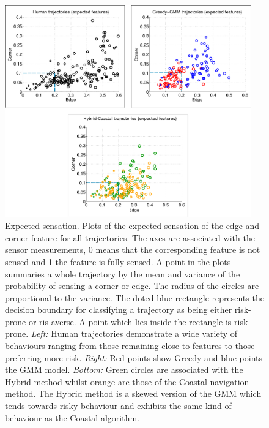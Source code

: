 \begin{figure}[h!]
  \centering
  \includegraphics[width=0.95\textwidth]{./ch3-Search/Figures/Figure6} 
  \caption{Expected sensation. Plots of the expected sensation of the edge and corner feature for all trajectories. 
  The axes are associated with the 
  sensor measurements, 0 means that the corresponding feature is not sensed and 1 the feature is fully sensed. 
  A point in the plots summaries a whole trajectory by the mean and variance of the probability of sensing a corner or edge. 
  The radius of the circles are proportional to the variance. The doted blue rectangle represents the decision boundary 
  for classifying a trajectory as being either risk-prone or ris-averse. A point which lies inside the rectangle is risk-prone.
  \textit{Left:} Human trajectories demonstrate a wide variety of behaviours ranging from those remaining close to features 
  to those preferring more risk. 
  \textit{Right:} Red points show Greedy and blue points the GMM model. 
  \textit{Bottom:} Green circles are associated with the Hybrid method whilst orange are those of the 
  Coastal navigation method. The Hybrid method is a skewed version of the GMM which tends towards risky behaviour and exhibits the 
  same kind of behaviour as the Coastal algorithm.}
  \label{fig:expectedfeatures}
\end{figure}


